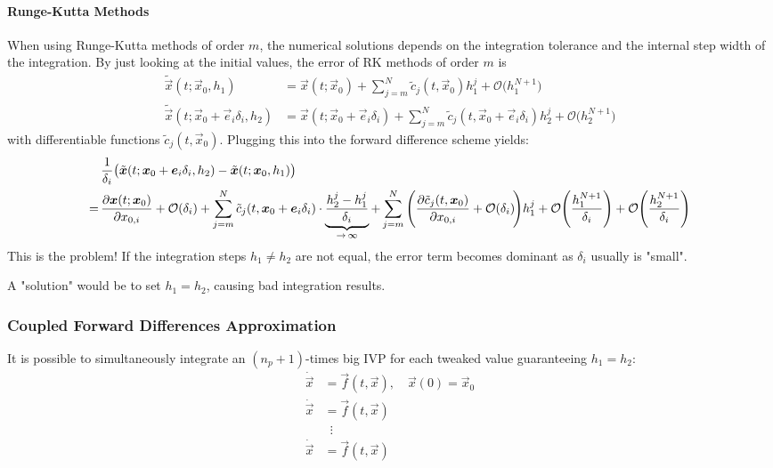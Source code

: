 				\paragraph{Runge-Kutta Methods}
					When using Runge-Kutta methods of order \(m\), the numerical solutions depends on the integration tolerance and the internal step width of the integration. By just looking at the initial values, the error of RK methods of order \(m\) is
					\begin{align*}
						\tilde{\vec{x}}(t; \vec{x}_0, h_1) &= \vec{x}(t; \vec{x}_0) + \sum_{j = m}^{N} \tilde{c}_j(t, \vec{x}_0) h_1^j + \mathcal{O}\big(h_1^{N + 1}\big) \\
						\tilde{\vec{x}}(t; \vec{x}_0 + \vec{e}_i \delta_i, h_2) &= \vec{x}(t; \vec{x}_0 + \vec{e}_i \delta_i) + \sum_{j = m}^{N} \tilde{c}_j(t, \vec{x}_0 + \vec{e}_i \delta_i) h_2^j + \mathcal{O}\big(h_2^{N + 1}\big)
					\end{align*}
					with differentiable functions \( \tilde{c}_j(t, \vec{x}_0) \). Plugging this into the forward difference scheme yields:
					\begin{align*}
						  &\, \frac{1}{\delta_i} \big( \tilde{\bm{x}}(t; \bm{x}_0 + \bm{e}_i \delta_i, h_2) - \tilde{\bm{x}}(t; \bm{x}_0, h_1) \big) \\
						= &\, \pdv{\bm{x}(t; \bm{x}_0)}{x_{0, i}} + \mathcal{O}(\delta_i) + \sum_{j = m}^{N} \tilde{c}_j(t, \bm{x}_0 + \bm{e}_i \delta_i) \cdot \underbrace{\frac{h_2^j - h_1^j}{\delta_i}}_{\to\,\infty} + \sum_{j = m}^{N} \Bigg( \pdv{\tilde{c}_j(t, \bm{x}_0)}{x_{0, i}} + \mathcal{O}(\delta_i) \!\Bigg) h_1^j + \mathcal{O}\Bigg( \frac{h_1^{N + 1}}{\delta_i} \Bigg) + \mathcal{O}\Bigg( \frac{h_2^{N + 1}}{\delta_i} \Bigg)
					\end{align*}
					This is the problem! If the integration steps \( h_1 \neq h_2 \) are not equal, the error term becomes dominant as \( \delta_i \) usually is "small".

					A "solution" would be to set \( h_1 = h_2 \), causing bad integration results.

			\subsubsection{Coupled Forward Differences Approximation}
				It is possible to simultaneously integrate an \( (n_p + 1) \)-times big IVP for each tweaked value guaranteeing \( h_1 = h_2 \):
				\begin{align*}
					\dot{\vec{x}} &= \vec{f}(t, \vec{x}),\quad \vec{x}(0) = \vec{x}_0 \\
					\dot{\vec{x}} &= \vec{f}(t, \vec{x}) \\
					&\,\,\,\vdots \\
					\dot{\vec{x}} &= \vec{f}(t, \vec{x})
				\end{align*}

